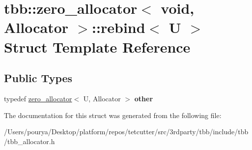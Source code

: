 \hypertarget{structtbb_1_1zero__allocator_3_01void_00_01Allocator_01_4_1_1rebind}{}\section{tbb\+:\+:zero\+\_\+allocator$<$ void, Allocator $>$\+:\+:rebind$<$ U $>$ Struct Template Reference}
\label{structtbb_1_1zero__allocator_3_01void_00_01Allocator_01_4_1_1rebind}
\subsection*{Public Types}
\begin{DoxyCompactItemize}
\item 
\hypertarget{structtbb_1_1zero__allocator_3_01void_00_01Allocator_01_4_1_1rebind_a6a001a156c058ee1194ba55ce534a43e}{}typedef \hyperlink{classtbb_1_1zero__allocator}{zero\+\_\+allocator}$<$ U, Allocator $>$ {\bfseries other}\label{structtbb_1_1zero__allocator_3_01void_00_01Allocator_01_4_1_1rebind_a6a001a156c058ee1194ba55ce534a43e}

\end{DoxyCompactItemize}


The documentation for this struct was generated from the following file\+:\begin{DoxyCompactItemize}
\item 
/\+Users/pourya/\+Desktop/platform/repos/tetcutter/src/3rdparty/tbb/include/tbb/tbb\+\_\+allocator.\+h\end{DoxyCompactItemize}
